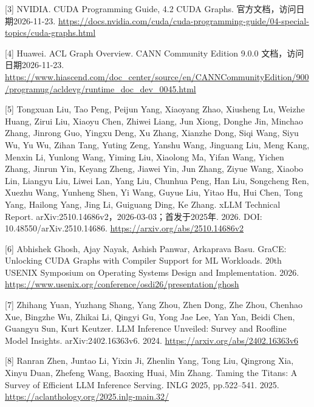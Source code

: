 \documentclass[UTF8,11pt,fontset=windows]{ctexart}
\begin{document}
\leavevmode{}%
{[}3{]} NVIDIA. CUDA Programming Guide, 4.2 CUDA Graphs. 官方文档，访问日期2026-11-23. \url{https://docs.nvidia.com/cuda/cuda-programming-guide/04-special-topics/cuda-graphs.html}

\leavevmode{}%
{[}4{]} Huawei. ACL Graph Overview. CANN Community Edition 9.0.0 文档，访问日期2026-11-23. \url{https://www.hiascend.com/doc_center/source/en/CANNCommunityEdition/900/programug/acldevg/runtime_doc_dev_0045.html}

\leavevmode{}%
{[}5{]} Tongxuan Liu, Tao Peng, Peijun Yang, Xiaoyang Zhao, Xiusheng Lu, Weizhe Huang, Zirui Liu, Xiaoyu Chen, Zhiwei Liang, Jun Xiong, Donghe Jin, Minchao Zhang, Jinrong Guo, Yingxu Deng, Xu Zhang, Xianzhe Dong, Siqi Wang, Siyu Wu, Yu Wu, Zihan Tang, Yuting Zeng, Yanshu Wang, Jinguang Liu, Meng Kang, Menxin Li, Yunlong Wang, Yiming Liu, Xiaolong Ma, Yifan Wang, Yichen Zhang, Jinrun Yin, Keyang Zheng, Jiawei Yin, Jun Zhang, Ziyue Wang, Xiaobo Lin, Liangyu Liu, Liwei Lan, Yang Liu, Chunhua Peng, Han Liu, Songcheng Ren, Xuezhu Wang, Yunheng Shen, Yi Wang, Guyue Liu, Yitao Hu, Hui Chen, Tong Yang, Hailong Yang, Jing Li, Guiguang Ding, Ke Zhang. xLLM Technical Report. arXiv:2510.14686v2，2026-03-03；首发于2025年. 2026. DOI: 10.48550/arXiv.2510.14686. \url{https://arxiv.org/abs/2510.14686v2}

\leavevmode{}%
{[}6{]} Abhishek Ghosh, Ajay Nayak, Ashish Panwar, Arkaprava Basu. GraCE: Unlocking CUDA Graphs with Compiler Support for ML Workloads. 20th USENIX Symposium on Operating Systems Design and Implementation. 2026. \url{https://www.usenix.org/conference/osdi26/presentation/ghosh}

\leavevmode{}%
{[}7{]} Zhihang Yuan, Yuzhang Shang, Yang Zhou, Zhen Dong, Zhe Zhou, Chenhao Xue, Bingzhe Wu, Zhikai Li, Qingyi Gu, Yong Jae Lee, Yan Yan, Beidi Chen, Guangyu Sun, Kurt Keutzer. LLM Inference Unveiled: Survey and Roofline Model Insights. arXiv:2402.16363v6. 2024. \url{https://arxiv.org/abs/2402.16363v6}

\leavevmode{}%
{[}8{]} Ranran Zhen, Juntao Li, Yixin Ji, Zhenlin Yang, Tong Liu, Qingrong Xia, Xinyu Duan, Zhefeng Wang, Baoxing Huai, Min Zhang. Taming the Titans: A Survey of Efficient LLM Inference Serving. INLG 2025, pp.522--541. 2025. \url{https://aclanthology.org/2025.inlg-main.32/}
\end{document}
